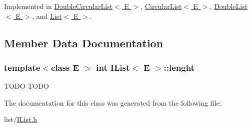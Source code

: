 Implemented in \hyperlink{class_double_circular_list_a95e0f27bda1158233015ee3ff27b3ade}{Double\-Circular\-List$<$ E $>$}, \hyperlink{class_circular_list_aa54489e11ad76bf929f92b1dce97a3a3}{Circular\-List$<$ E $>$}, \hyperlink{class_double_list_a3c95ac3c3190b347c4a343776264bf67}{Double\-List$<$ E $>$}, and \hyperlink{class_list_ac8b31be96806bd56f655436629ac2e7a}{List$<$ E $>$}.



\subsection{Member Data Documentation}
\hypertarget{class_i_list_a64ce981ba1104bbb482068983cb5a3bc}{
\subsubsection[{lenght}]{\setlength{\rightskip}{0pt plus 5cm}template$<$class E $>$ int {\bf I\-List}$<$ E $>$\-::lenght\hspace{0.3cm}{\ttfamily [protected]}}}\label{class_i_list_a64ce981ba1104bbb482068983cb5a3bc}
T\-O\-D\-O T\-O\-D\-O 

The documentation for this class was generated from the following file\-:\begin{DoxyCompactItemize}
\item 
list/\hyperlink{_i_list_8h}{I\-List.\-h}\end{DoxyCompactItemize}
